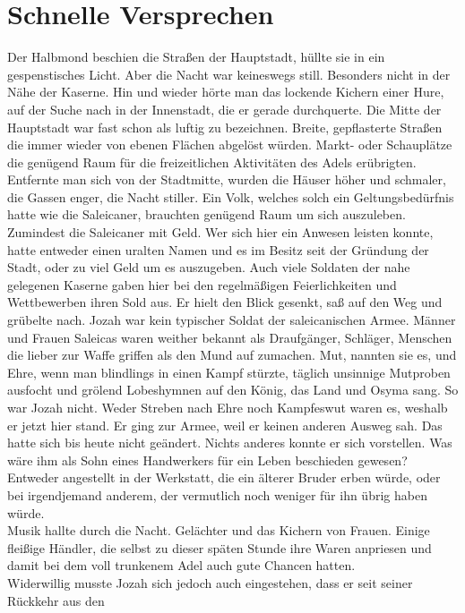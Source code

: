 \chapter{Schnelle Versprechen}


Der Halbmond beschien die Straßen der Hauptstadt, hüllte sie in ein gespenstisches Licht. Aber die 
Nacht war keineswegs still. Besonders nicht in der Nähe der Kaserne. Hin und wieder hörte man das 
lockende Kichern einer Hure, auf der Suche nach in der Innenstadt, die er gerade durchquerte. Die 
Mitte der Hauptstadt war fast schon als luftig zu bezeichnen. Breite, gepflasterte Straßen die 
immer wieder von ebenen Flächen abgelöst würden. Markt- oder Schauplätze die genügend Raum für die 
freizeitlichen Aktivitäten des Adels erübrigten. Entfernte man sich von der Stadtmitte, wurden die 
Häuser höher und schmaler, die Gassen enger, die Nacht stiller. Ein Volk, welches solch ein 
Geltungsbedürfnis hatte wie die Saleicaner, brauchten genügend Raum um sich auszuleben. Zumindest 
die Saleicaner mit Geld. Wer sich hier ein Anwesen leisten konnte, hatte entweder einen uralten 
Namen und es im Besitz seit der Gründung der Stadt, oder zu viel Geld um es auszugeben. Auch viele 
Soldaten der nahe gelegenen Kaserne gaben hier bei den regelmäßigen Feierlichkeiten und 
Wettbewerben ihren Sold aus. 
Er hielt den Blick gesenkt, saß auf den Weg und grübelte nach. Jozah war kein typischer Soldat der 
saleicanischen Armee. Männer und Frauen Saleicas waren weither bekannt als Draufgänger, Schläger, 
Menschen die lieber zur Waffe griffen als den Mund auf zumachen. Mut, nannten sie es, und Ehre, 
wenn man blindlings in einen Kampf stürzte, täglich unsinnige Mutproben ausfocht und grölend 
Lobeshymnen auf den König, das Land und Osyma sang. So war Jozah nicht. Weder Streben nach Ehre 
noch Kampfeswut waren es, weshalb er jetzt hier stand. Er ging zur Armee, weil er keinen anderen 
Ausweg sah. Das hatte sich bis heute nicht geändert. Nichts anderes konnte er sich vorstellen. Was 
wäre ihm als Sohn eines Handwerkers für ein Leben beschieden gewesen? Entweder angestellt in der 
Werkstatt, die ein älterer Bruder erben würde, oder bei irgendjemand anderem, der vermutlich noch 
weniger für ihn übrig haben würde. \\
Musik hallte durch die Nacht. Gelächter und das Kichern von Frauen. Einige fleißige Händler, die 
selbst zu dieser späten Stunde ihre Waren anpriesen und damit bei dem voll trunkenem Adel auch gute 
Chancen hatten.\\
Widerwillig musste Jozah sich jedoch auch eingestehen, dass er seit seiner Rückkehr aus den 
